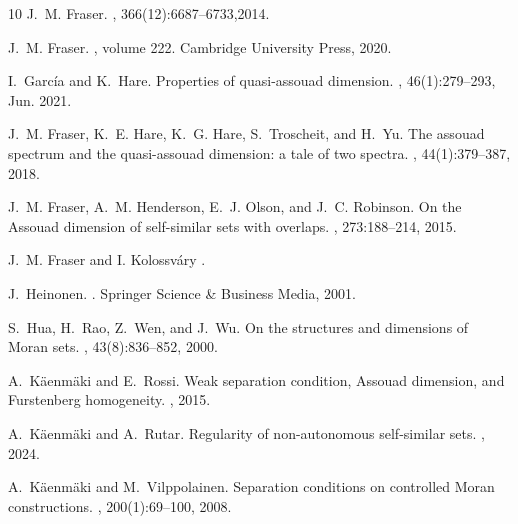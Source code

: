 \documentclass[12pt]{amsart}
\numberwithin{equation}{section}
\theoremstyle{plain}
\theoremstyle{remark}
\theoremstyle{definition}
\begin{document}
\begin{thebibliography}{10}
		J.~M. Fraser.
		, 366(12):6687--6733,2014.

		J.~M. Fraser.
		, volume 222.
		\newblock Cambridge University Press, 2020.
		
		I.~García and K.~Hare.
		\newblock Properties of quasi-assouad dimension.
		, 46(1):279–293, Jun. 2021.

		J.~M. Fraser, K.~E. Hare, K.~G. Hare, S.~Troscheit, and H.~Yu.
		\newblock The assouad spectrum and the quasi-assouad dimension: a tale of two
		spectra.
		, 44(1):379--387, 2018.
		
		J.~M. Fraser, A.~M. Henderson, E.~J. Olson, and J.~C. Robinson.
		\newblock On the {A}ssouad dimension of self-similar sets with overlaps.
		, 273:188--214, 2015.
		
		J.~M. Fraser and I. Kolossv\'{a}ry
		.
		
		
		J.~Heinonen.
		.
		\newblock Springer Science \& Business Media, 2001.
		
		S.~Hua, H.~Rao, Z.~Wen, and J.~Wu.
		\newblock On the structures and dimensions of {M}oran sets.
		, 43(8):836--852, 2000.
		
		A.~K{\"a}enm{\"a}ki and E.~Rossi.
		\newblock Weak separation condition, {A}ssouad dimension, and {F}urstenberg
		homogeneity.
		, 2015.
		
		A.~K{\"a}enm{\"a}ki and A.~Rutar.
		\newblock Regularity of non-autonomous self-similar sets.
		, 2024.
		
		A.~K\"aenm\"aki and M.~Vilppolainen.
		\newblock Separation conditions on controlled {M}oran constructions.
		, 200(1):69--100, 2008.
		

\end{thebibliography}
\end{document}
